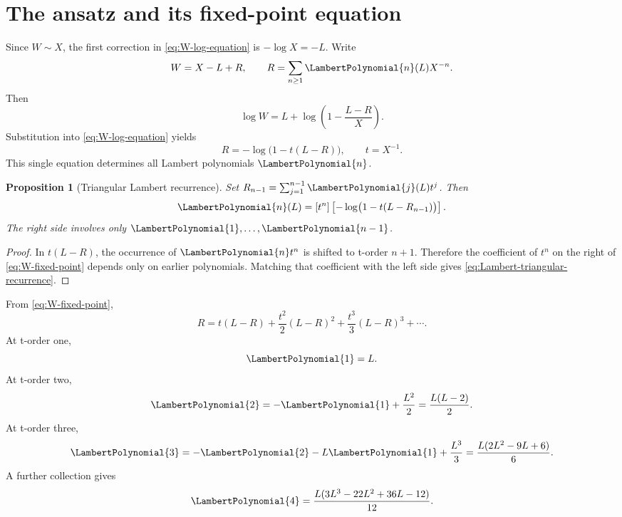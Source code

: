 \documentclass[11pt,openany]{book}
\theoremstyle{definition}
\theoremstyle{plain}
\newtheorem{proposition}{Proposition}[chapter]
\theoremstyle{remark}
\begin{document}
\section{The ansatz and its fixed-point equation}
Since \(W\sim X\), the first correction in \cref{eq:W-log-equation} is
\(-\log X=-L\).  Write
\begin{equation}\label{eq:W-ansatz}
 W=X-L+R,
 \qquad
 R=\sum_{n\ge1}\LambertPolynomial{n}(L)X^{-n}.
\end{equation}
Then
\[
 \log W
 =L+\log\!\left(1-\frac{L-R}{X}\right).
\]
Substitution into \cref{eq:W-log-equation} yields
\begin{equation}\label{eq:W-fixed-point}
 R=-\log\bigl(1-t(L-R)\bigr),
 \qquad t=X^{-1}.
\end{equation}
This single equation determines all Lambert polynomials \(\LambertPolynomial{n}\).

\begin{proposition}[Triangular Lambert recurrence]\label{prop:Lambert-triangular}
Set \(R_{n-1}=\sum_{j=1}^{n-1}\LambertPolynomial{j}(L)t^j\).  Then
\begin{equation}\label{eq:Lambert-triangular-recurrence}
 \LambertPolynomial{n}(L)=[t^n]\left[-\log\bigl(1-t(L-R_{n-1})\bigr)\right].
\end{equation}
The right side involves only \(\LambertPolynomial{1},\ldots,\LambertPolynomial{n-1}\).
\end{proposition}
\begin{proof}
In \(t(L-R)\), the occurrence of \(\LambertPolynomial{n}t^n\) is shifted to t-order \(n+1\).
Therefore the coefficient of \(t^n\) on the right of
\cref{eq:W-fixed-point} depends only on earlier polynomials.  Matching that
coefficient with the left side gives \cref{eq:Lambert-triangular-recurrence}.
\end{proof}

\begin{workedbox}[title={The first four Lambert polynomials}]
From \cref{eq:W-fixed-point},
\[
 R=t(L-R)+\frac{t^2}{2}(L-R)^2
   +\frac{t^3}{3}(L-R)^3+\cdots.
\]
At t-order one,
\[
 \LambertPolynomial{1}=L.
\]
At t-order two,
\[
 \LambertPolynomial{2}=-\LambertPolynomial{1}+\frac{L^2}{2}
 =\frac{L(L-2)}2.
\]
At t-order three,
\[
 \LambertPolynomial{3}=-\LambertPolynomial{2}-L\LambertPolynomial{1}+\frac{L^3}{3}
 =\frac{L(2L^2-9L+6)}6.
\]
A further collection gives
\[
 \LambertPolynomial{4}=\frac{L(3L^3-22L^2+36L-12)}{12}.
\]
\end{workedbox}
\end{document}
